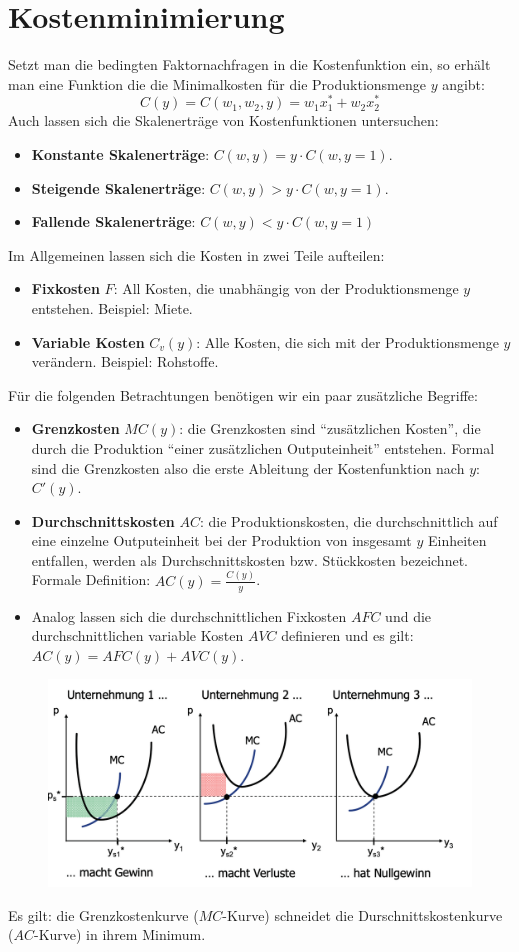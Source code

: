 \section{Kostenminimierung}

Setzt man die bedingten Faktornachfragen in die Kostenfunktion ein, so erhält man eine Funktion die die Minimalkosten für die Produktionsmenge $y$ angibt:
	$$ C(y) = C(w_1, w_2, y) = w_1 x_1^* + w_2 x_2^* $$
Auch lassen sich die Skalenerträge von Kostenfunktionen untersuchen:
\begin{itemize}
	\item \textbf{Konstante Skalenerträge}: $C(w, y) = y \cdot C(w, y = 1)$. 
	\item \textbf{Steigende Skalenerträge}: $C(w, y) > y \cdot C(w, y = 1)$.
	\item \textbf{Fallende Skalenerträge}: $C(w, y) < y \cdot C(w, y = 1)$
\end{itemize}

Im Allgemeinen lassen sich die Kosten in zwei Teile aufteilen:
\begin{itemize}
	\item \textbf{Fixkosten} $F$: All Kosten, die unabhängig von der Produktionsmenge $y$ entstehen. Beispiel: Miete.
	\item \textbf{Variable Kosten} $C_v(y)$: Alle Kosten, die sich mit der Produktionsmenge $y$ verändern. Beispiel: Rohstoffe.
\end{itemize}

Für die folgenden Betrachtungen benötigen wir ein paar zusätzliche Begriffe:
\begin{itemize}
	\item \textbf{Grenzkosten} $MC(y)$: die Grenzkosten sind \enquote{zusätzlichen Kosten}, die durch die Produktion \enquote{einer zusätzlichen Outputeinheit} entstehen. Formal sind die Grenzkosten also die erste Ableitung der Kostenfunktion nach $y$: $C'(y)$.
	\item \textbf{Durchschnittskosten} $AC$: die Produktionskosten, die durchschnittlich auf eine einzelne Outputeinheit bei der Produktion von insgesamt $y$ Einheiten entfallen, werden als Durchschnittskosten bzw. Stückkosten bezeichnet. Formale Definition: $AC(y) = \frac{C(y)}{y}$.
	\item Analog lassen sich die durchschnittlichen Fixkosten $AFC$ und die durchschnittlichen variable Kosten $AVC$ definieren und es gilt: $AC(y) = AFC(y) + AVC(y)$.
\end{itemize}

\begin{figure}[!htbp] \centering
	\includegraphics[scale=0.2425]{img/acmc}
\end{figure}

Es gilt: die Grenzkostenkurve ($MC$-Kurve) schneidet die Durschnittskostenkurve ($AC$-Kurve) in ihrem Minimum.